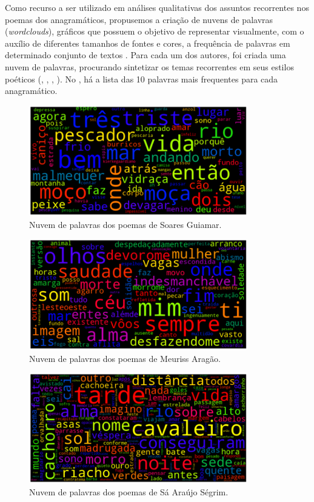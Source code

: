 \documentclass[portuguese]{textolivre}
\begin{document}
Como recurso a ser utilizado em análises qualitativas dos assuntos recorrentes nos poemas dos anagramáticos, propusemos a criação de nuvens de palavras (\textit{wordclouds}), gráficos que possuem o objetivo de representar visualmente, com o auxílio de diferentes tamanhos de fontes e cores, a frequência de palavras em determinado conjunto de textos \cite{jafar_framework_2012}. Para cada um dos autores, foi criada uma nuvem de palavras, procurando sintetizar os temas recorrentes em seus estilos poéticos (, , , ). No , há a lista das 10 palavras mais frequentes para cada anagramático.

\begin{figure}[h!]
 \centering
 \includegraphics[width=0.85\textwidth]{fig-003.png}
 \caption{Nuvem de palavras dos poemas de Soares Guiamar.}
 \label{fig03}
\end{figure}

\begin{figure}[h!]
 \centering
 \includegraphics[width=0.85\textwidth]{fig-004.png}
 \caption{Nuvem de palavras dos poemas de Meuriss Aragão.}
 \label{fig04}
\end{figure}

\begin{figure}[h!]
 \centering
 \includegraphics[width=0.85\textwidth]{fig-005.png}
 \caption{Nuvem de palavras dos poemas de Sá Araújo Ségrim.}
 \label{fig05}
\end{figure}
\end{document}
